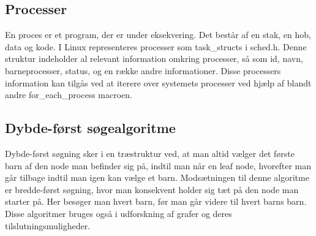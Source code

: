 \subsection{Processer}
En proces er et program, der er under eksekvering. Det består af en stak, en hob, data og kode. I Linux representeres processer som task\_structs i sched.h. Denne struktur indeholder al relevant information omkring processer, så som id, navn, barneprocesser, status, og en række andre informationer. Disse processers information kan tilgås ved at iterere over systemets processer ved hjælp af blandt andre for\_each\_process macroen.
\subsection{Dybde-først søgealgoritme}
Dybde-først søgning sker i en træstruktur ved, at man altid vælger det første barn af den node man befinder sig på, indtil man når en leaf node, hvorefter man går tilbage indtil man igen kan vælge et barn. Modsætningen til denne algoritme er bredde-først søgning, hvor man konsekvent holder sig tæt på den node man starter på. Her besøger man hvert barn, før man går videre til hvert barns barn. Disse algoritmer bruges også i udforskning af grafer og deres tilslutningsmuligheder.